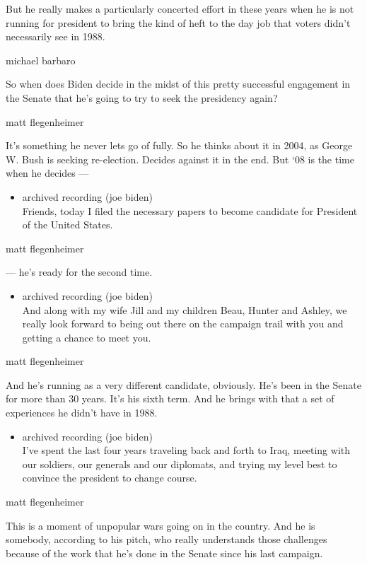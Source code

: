 But he really makes a particularly concerted effort in these years when
he is not running for president to bring the kind of heft to the day job
that voters didn't necessarily see in 1988.

michael barbaro

So when does Biden decide in the midst of this pretty successful
engagement in the Senate that he's going to try to seek the presidency
again?

matt flegenheimer

It's something he never lets go of fully. So he thinks about it in 2004,
as George W. Bush is seeking re-election. Decides against it in the end.
But `08 is the time when he decides ---

\begin{itemize}
\tightlist
\item
  archived recording (joe biden)\\
  Friends, today I filed the necessary papers to become candidate for
  President of the United States.
\end{itemize}

matt flegenheimer

--- he's ready for the second time.

\begin{itemize}
\tightlist
\item
  archived recording (joe biden)\\
  And along with my wife Jill and my children Beau, Hunter and Ashley,
  we really look forward to being out there on the campaign trail with
  you and getting a chance to meet you.
\end{itemize}

matt flegenheimer

And he's running as a very different candidate, obviously. He's been in
the Senate for more than 30 years. It's his sixth term. And he brings
with that a set of experiences he didn't have in 1988.

\begin{itemize}
\tightlist
\item
  archived recording (joe biden)\\
  I've spent the last four years traveling back and forth to Iraq,
  meeting with our soldiers, our generals and our diplomats, and trying
  my level best to convince the president to change course.
\end{itemize}

matt flegenheimer

This is a moment of unpopular wars going on in the country. And he is
somebody, according to his pitch, who really understands those
challenges because of the work that he's done in the Senate since his
last campaign.

